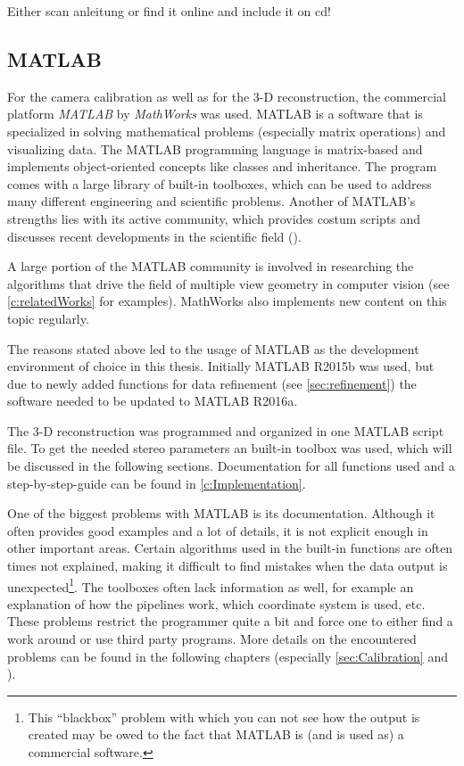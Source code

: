 Either scan anleitung or find it online and include it on cd!

\subsection{MATLAB} \label{ssec:Matlab}
For the camera calibration as well as for the 3-D reconstruction, the commercial platform \textit{MATLAB} by \textit{MathWorks} was used. MATLAB is a software that is specialized in solving mathematical problems (especially matrix operations) and visualizing data. The MATLAB programming language is matrix-based and implements object-oriented concepts like classes and inheritance. The program comes with a large library of built-in toolboxes, which can be used to address many different engineering and scientific problems. Another of MATLAB's strengths lies with its active community, which provides costum scripts and discusses recent developments in the scientific field (\cite{MathWorks.2016}).

A large portion of the MATLAB community is involved in researching the algorithms that drive the field of multiple view geometry in computer vision (see \autoref{c:relatedWorks} for examples). MathWorks also implements new content on this topic regularly. 

The reasons stated above led to the usage of MATLAB as the development environment of choice in this thesis. Initially MATLAB R2015b was used, but due to newly added functions for data refinement (see \autoref{sec:refinement}) the software needed to be updated to MATLAB R2016a.
   
The 3-D reconstruction was programmed and organized in one MATLAB script file. To get the needed stereo parameters an built-in toolbox was used, which will be discussed in the following sections. Documentation for all functions used and a step-by-step-guide can be found in \autoref{c:Implementation}.

One of the biggest problems with MATLAB is its documentation. Although it often provides good examples and a lot of details, it is not explicit enough in other important areas. Certain algorithms used in the built-in functions are often times not explained, making it difficult to find mistakes when the data output is unexpected\footnote{This \enquote{blackbox} problem with which you can not see how the output is created may be owed to the fact that MATLAB is (and is used as) a commercial software.}. The toolboxes often lack information as well, for example an explanation of how the pipelines work, which coordinate system is used, etc. These problems restrict the programmer quite a bit and force one to either find a work around or use third party programs. More details on the encountered problems can be found in the following chapters (especially \autoref{sec:Calibration} and ).

